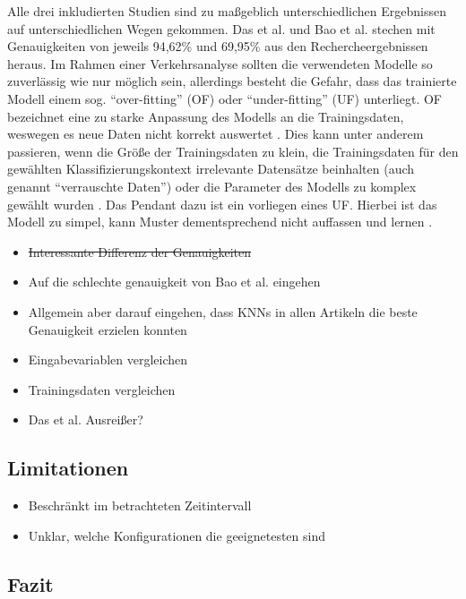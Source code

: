 \documentclass{scrartcl}
\begin{document}
Alle drei inkludierten Studien sind zu maßgeblich unterschiedlichen Ergebnissen
auf unterschiedlichen Wegen gekommen. Das et al. und Bao et al. stechen
mit Genauigkeiten von jeweils 94,62\% und 69,95\% aus den Rechercheergebnissen
heraus. Im Rahmen einer Verkehrsanalyse sollten die verwendeten Modelle so
zuverlässig wie nur möglich sein, allerdings besteht die Gefahr, dass das trainierte
Modell einem sog. \enquote{over-fitting} (OF) oder \enquote{under-fitting} (UF)
unterliegt. OF bezeichnet eine zu starke Anpassung des Modells an die Trainingsdaten,
weswegen es neue Daten nicht korrekt auswertet \cite{aws}.
Dies kann unter anderem passieren, wenn die Größe der Trainingsdaten zu klein,
die Trainingsdaten für den gewählten Klassifizierungskontext irrelevante
Datensätze beinhalten (auch genannt \enquote{verrauschte Daten}) oder
die Parameter des Modells zu komplex gewählt wurden \cite{aws}. Das Pendant
dazu ist ein vorliegen eines UF. Hierbei ist das Modell zu simpel, kann
Muster dementsprechend nicht auffassen und lernen \cite{ibm2}.

\begin{itemize}
   \item{\sout{Interessante Differenz der Genauigkeiten}}
   \item{Auf die schlechte genauigkeit von Bao et al. eingehen}
   \item{Allgemein aber darauf eingehen, dass KNNs in allen Artikeln die beste Genauigkeit erzielen konnten}
   \item{Eingabevariablen vergleichen}
   \item{Trainingsdaten vergleichen}
   \item{Das et al. Ausreißer?}
\end{itemize}

\subsection{Limitationen}

\begin{itemize}
   \item{Beschränkt im betrachteten Zeitintervall}
   \item{Unklar, welche Konfigurationen die geeignetesten sind}
\end{itemize}

\subsection{Fazit}
\end{document}

